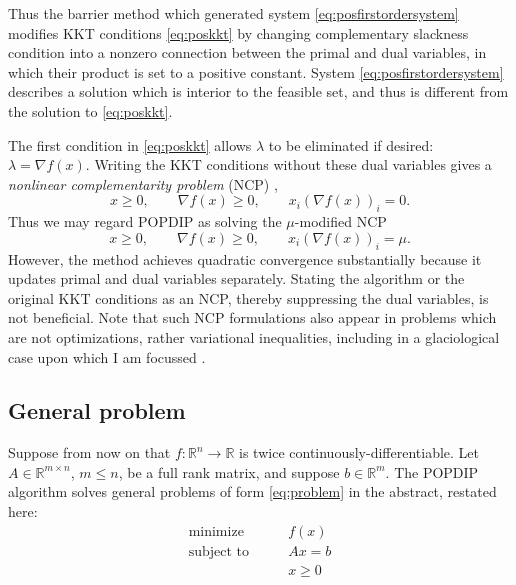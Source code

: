 \documentclass[11pt]{article}
\newcommand{\RR}{\mathbb{R}}
\newcommand{\grad}{\nabla}
\begin{document}
Thus the barrier method which generated system \eqref{eq:posfirstordersystem} modifies KKT conditions \eqref{eq:poskkt} by changing complementary slackness condition into a nonzero connection between the primal and dual variables, in which their product is set to a positive constant.  System \eqref{eq:posfirstordersystem} describes a solution which is interior to the feasible set, and thus is different from the solution to \eqref{eq:poskkt}.

The first condition in \eqref{eq:poskkt} allows $\lambda$ to be eliminated if desired: $\lambda = \grad f(x)$.  Writing the KKT conditions without these dual variables gives a \emph{nonlinear complementarity problem} (NCP) \cite{FacchineiPang2007},
\begin{equation}
x \ge 0, \qquad \grad f(x) \ge 0, \qquad x_i (\grad f(x))_i = 0.  \label{eq:posncp}
\end{equation}
Thus we may regard POPDIP as solving the $\mu$-modified NCP
\begin{equation}
x \ge 0, \qquad \grad f(x) \ge 0, \qquad x_i (\grad f(x))_i = \mu. \label{eq:mumodifiedncp}
\end{equation}
However, the method achieves quadratic convergence substantially because it updates primal and dual variables separately.  Stating the algorithm or the original KKT conditions as an NCP, thereby suppressing the dual variables, is not beneficial.  Note that such NCP formulations also appear in problems which are not optimizations, rather variational inequalities, including in a glaciological case upon which I am focussed \cite{Bueler2016}.


\subsection*{General problem}

Suppose from now on that $f:\RR^n \to \RR$ is twice continuously-differentiable.  Let $A\in\RR^{m\times n}$, $m\le n$, be a full rank matrix, and suppose $b\in\RR^m$.  The POPDIP algorithm solves general problems of form \eqref{eq:problem} in the abstract, restated here:
\begin{equation}
\begin{matrix}
\text{minimize} \qquad   & f(x) \\
\text{subject to} \qquad & A x = b \\
                         & x \ge 0
\end{matrix} \tag{1}
\end{equation}
\end{document}

